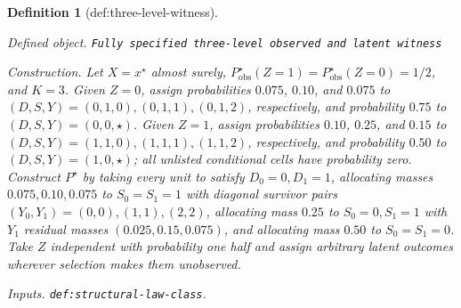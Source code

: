 \documentclass{article}
\newtheorem{definition}{Definition}
\begin{document}
\begin{definition}[def:three-level-witness]\label{def:three-level-witness}
\par\smallskip\noindent\emph{Defined object.} \texttt{Fully specified three-\allowbreak{}level observed and latent witness}
\par\smallskip\noindent\emph{Construction.} Let \(X=x^{\star}\) almost surely, \(P_{\mathrm{obs}}^{\star}(Z=1)=P_{\mathrm{obs}}^{\star}(Z=0)=1/2\), and \(K=3\). Given \(Z=0\), assign probabilities \(0.075\), \(0.10\), and \(0.075\) to \((D,S,Y)=(0,1,0),(0,1,1),(0,1,2)\), respectively, and probability \(0.75\) to \((D,S,Y)=(0,0,\star)\). Given \(Z=1\), assign probabilities \(0.10\), \(0.25\), and \(0.15\) to \((D,S,Y)=(1,1,0),(1,1,1),(1,1,2)\), respectively, and probability \(0.50\) to \((D,S,Y)=(1,0,\star)\); all unlisted conditional cells have probability zero. Construct \(P^{\star}\) by taking every unit to satisfy \(D_0=0,D_1=1\), allocating masses \(0.075,0.10,0.075\) to \(S_0=S_1=1\) with diagonal survivor pairs \((Y_0,Y_1)=(0,0),(1,1),(2,2)\), allocating mass \(0.25\) to \(S_0=0,S_1=1\) with \(Y_1\) residual masses \((0.025,0.15,0.075)\), and allocating mass \(0.50\) to \(S_0=S_1=0\). Take \(Z\) independent with probability one half and assign arbitrary latent outcomes wherever selection makes them unobserved.
\par\smallskip\noindent\emph{Inputs.} \texttt{def:\allowbreak{}structural-\allowbreak{}law-\allowbreak{}class}.
\end{definition}
\end{document}
